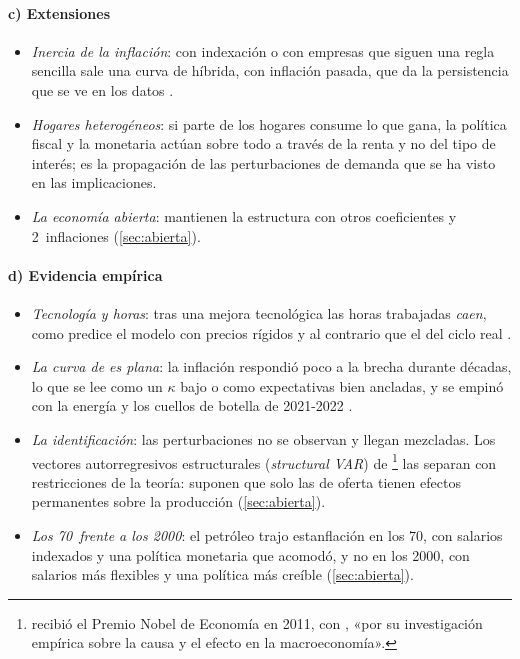 \documentclass[11pt]{article}
\begin{document}
\paragraph{c) Extensiones}

\begin{itemize}
\item \emph{Inercia de la inflación}: con indexación o con empresas que siguen una regla sencilla sale una curva de  híbrida, con inflación pasada, que da la persistencia que se ve en los datos\nocite{GaliGertler1999Inflation} .
\item \emph{Hogares heterogéneos}: si parte de los hogares consume lo que gana, la política fiscal y la monetaria actúan sobre todo a través de la renta y no del tipo de interés\nocite{GaliLopezSalidoValles2007,KaplanMollViolante2018Monetary}; es la propagación de las perturbaciones de demanda que se ha visto en las implicaciones.
\item \emph{La economía abierta}: \textcite{GaliMonacelli2005Monetary} mantienen la estructura con otros coeficientes y 2~inflaciones (\ref{sec:abierta}).
\end{itemize}

\paragraph{d) Evidencia empírica}

\begin{itemize}
\item \emph{Tecnología y horas}: tras una mejora tecnológica las horas trabajadas \emph{caen}, como predice el modelo con precios rígidos y al contrario que el del ciclo real\nocite{Gali1999Technology,BasuFernaldKimball2006Are} .
\item \emph{La curva de  es plana}: la inflación respondió poco a la brecha durante décadas, lo que se lee como un $\kappa$ bajo o como expectativas bien ancladas, y se empinó con la energía y los cuellos de botella de 2021-2022\nocite{BernankeBlanchard2025What} .
\item \emph{La identificación}: las perturbaciones no se observan y llegan mezcladas. Los vectores autorregresivos estructurales (\emph{structural VAR}) de \textcite{Sims1980Macroeconomics}\footnote{ recibió el Premio Nobel de Economía en 2011, con , «por su investigación empírica sobre la causa y el efecto en la macroeconomía»\nocite{Nobel2011SargentSims}.} las separan con restricciones de la teoría: \textcite{BlanchardQuah1989} suponen que solo las de oferta tienen efectos permanentes sobre la producción (\ref{sec:abierta}).
\item \emph{Los 70~frente a los 2000}: el petróleo trajo estanflación en los 70, con salarios indexados y una política monetaria que acomodó, y no en los 2000, con salarios más flexibles y una política más creíble\nocite{BlanchardGali2010Oil} (\ref{sec:abierta}).
\end{itemize}
\end{document}
